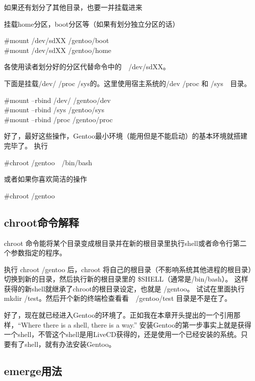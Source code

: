 如果还有划分了其他目录，也要一并挂载进来

挂载home分区，boot分区等（如果有划分独立分区的话）
\begin{code}
\#mount /dev/sdXX /gentoo/boot\\
\#mount /dev/sdXX /gentoo/home
\end{code}

各使用读者划分好的分区代替命令中的　/dev/sdXX。

下面是挂载/dev/ /proc /sys的。这里使用宿主系统的/dev /proc 和 /sys　目录。
\begin{code}
\#mount --rbind /dev/ /gentoo/dev\\
\#mount --rbind /sys /gentoo/sys\\
\#mount --rbind /proc /gentoo/proc
\end{code}

好了，最好这些操作，Gentoo最小环境（能用但是不能启动）的基本环境就搭建完毕了。
执行

\begin{code}
\#chroot /gentoo　/bin/bash
\end{code}
或者如果你喜欢简洁的操作
\begin{code}
\#chroot /gentoo
\end{code}

\begin{insertnote}
\subsection*{chroot命令解释}

chroot 命令能将某个目录变成根目录并在新的根目录里执行shell或者命令行第二个参数指定的程序。

执行 chroot /gentoo 后，chroot 将自己的根目录（不影响系统其他进程的根目录）切换到新的目录，然后执行新的根目录里的 \$SHELL（通常是/bin/bash）。
这样获得的新shell就继承了chroot的根目录设定，也就是 /gentoo。 试试在里面执行　mkdir /test。然后开个新的终端检查看看　/gentoo/test 目录是不是在了。
\end{insertnote}


好了，现在就已经进入Gentoo的环境了。正如我在本章开头提出的一个引用那样，“Where there is a shell, there is a way.” 安装Gentoo的第一步事实上就是获得一个shell，不管这个shell是用LiveCD获得的，还是使用一个已经安装的系统。只要有了shell，就有办法安装Gentoo。

\subsection{emerge用法}\label{sec:quickemergeguide}

